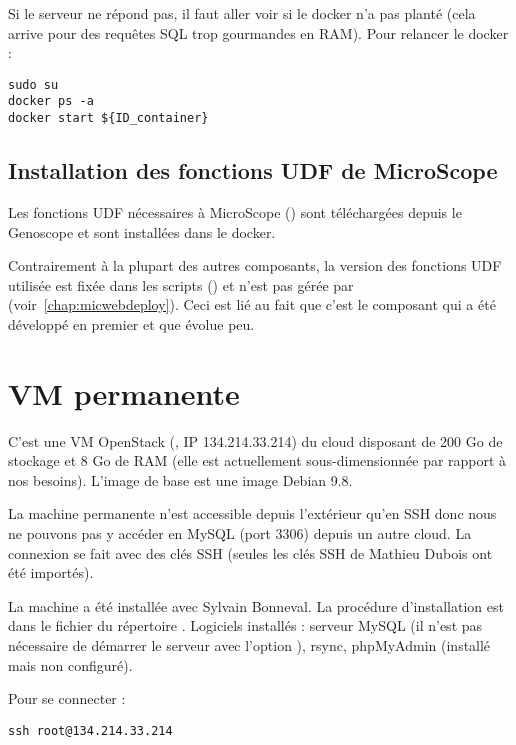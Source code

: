 Si le serveur ne répond pas, il faut aller voir si le docker n'a pas planté (cela arrive pour des requêtes SQL trop gourmandes en RAM).
Pour relancer le docker :
\begin{lstlisting}[style=bash]
sudo su
docker ps -a
docker start ${ID_container}
\end{lstlisting}

\subsection{Installation des fonctions UDF de MicroScope}

Les fonctions UDF nécessaires à MicroScope ()
sont téléchargées depuis le Genoscope et
sont installées dans le docker.

\begin{warningbox}
    Contrairement à la plupart des autres composants, la version des fonctions UDF utilisée
    est fixée dans les scripts (\micUDFVersion) et n'est pas gérée par \micWEBdeployVer{} (voir~\autoref{chap:micwebdeploy}).
    Ceci est lié au fait que c'est le composant qui a été développé en premier
    et que  évolue peu.
\end{warningbox}

\section{VM permanente}\label{VMpermanente}

C'est une VM OpenStack (, IP 134.214.33.214) du cloud  disposant de 200 Go de stockage et 8 Go de RAM (elle est actuellement sous-dimensionnée par rapport à nos besoins).
L'image de base est une image Debian 9.8.

La machine permanente n'est accessible depuis l'extérieur qu'en SSH donc nous ne pouvons pas y accéder en MySQL (port 3306) depuis un autre cloud.
La connexion se fait avec des clés SSH (seules les clés SSH de Mathieu Dubois ont été importés).

La machine a été installée avec Sylvain Bonneval.
La procédure d'installation est dans le fichier  du répertoire .
Logiciels installés : serveur MySQL (il n'est pas nécessaire de démarrer le serveur avec l'option ), rsync, phpMyAdmin (installé mais non configuré).

Pour se connecter :
\begin{lstlisting}[style=bash]
ssh root@134.214.33.214
\end{lstlisting}


